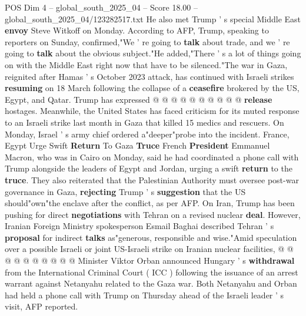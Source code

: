 \begin{textsample}{POS Dim 4 – global\_south\_2025\_04 – Score 18.00 – global\_south\_2025\_04/123282517.txt}
He also met Trump ' s special Middle East \textbf{envoy} Steve Witkoff on Monday.
According to AFP, Trump, speaking to reporters on Sunday, confirmed,"We ' re going to \textbf{talk} about trade, and we ' re going to \textbf{talk} about the obvious subject."He added,"There ' s a lot of things going on with the Middle East right now that have to be silenced."The war in Gaza, reignited after Hamas ' s October 2023 attack, has continued with Israeli strikes \textbf{resuming} on 18 March following the collapse of a \textbf{ceasefire} brokered by the US, Egypt, and Qatar.
Trump has expressed @ @ @ @ @ @ @ @ @ @ \textbf{release} hostages.
Meanwhile, the United States has faced criticism for its muted response to an Israeli strike last month in Gaza that killed 15 medics and rescuers.
On Monday, Israel ' s army chief ordered a"deeper"probe into the incident.
France, Egypt Urge Swift \textbf{Return} To Gaza \textbf{Truce} French \textbf{President} Emmanuel Macron, who was in Cairo on Monday, said he had coordinated a phone call with Trump alongside the leaders of Egypt and Jordan, urging a swift \textbf{return} to the \textbf{truce}.
They also reiterated that the Palestinian Authority must oversee post-war governance in Gaza, \textbf{rejecting} Trump ' s \textbf{suggestion} that the US should"own"the enclave after the conflict, as per AFP.
On Iran, Trump has been pushing for direct \textbf{negotiations} with Tehran on a revised nuclear \textbf{deal}.
However, Iranian Foreign Ministry spokesperson Esmail Baghai described Tehran ' s \textbf{proposal} for indirect \textbf{talks} as"generous, responsible and wise."Amid speculation over a possible Israeli or joint US-Israeli strike on Iranian nuclear facilities, @ @ @ @ @ @ @ @ @ @ Minister Viktor Orban announced Hungary ' s \textbf{withdrawal} from the International Criminal Court ( ICC ) following the issuance of an arrest warrant against Netanyahu related to the Gaza war.
Both Netanyahu and Orban had held a phone call with Trump on Thursday ahead of the Israeli leader ' s visit, AFP reported.

\end{textsample}
